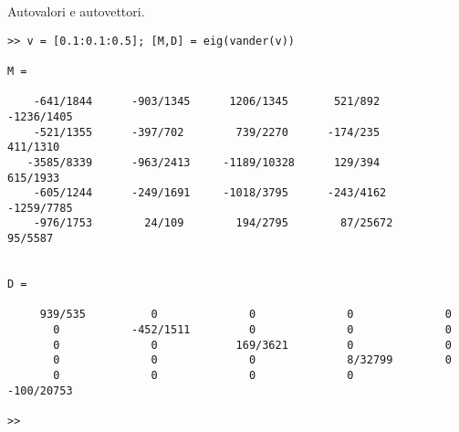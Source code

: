 
\begin{exe}Autovalori e autovettori.

\begin{codice}
\begin{verbatim}
>> v = [0.1:0.1:0.5]; [M,D] = eig(vander(v))

M =

    -641/1844      -903/1345      1206/1345       521/892      -1236/1405  
    -521/1355      -397/702        739/2270      -174/235        411/1310  
   -3585/8339      -963/2413     -1189/10328      129/394        615/1933  
    -605/1244      -249/1691     -1018/3795      -243/4162     -1259/7785  
    -976/1753        24/109        194/2795        87/25672       95/5587  


D =

     939/535          0              0              0              0       
       0           -452/1511         0              0              0       
       0              0            169/3621         0              0       
       0              0              0              8/32799        0       
       0              0              0              0           -100/20753 

>> 
\end{verbatim}
\end{codice}

\end{exe}

